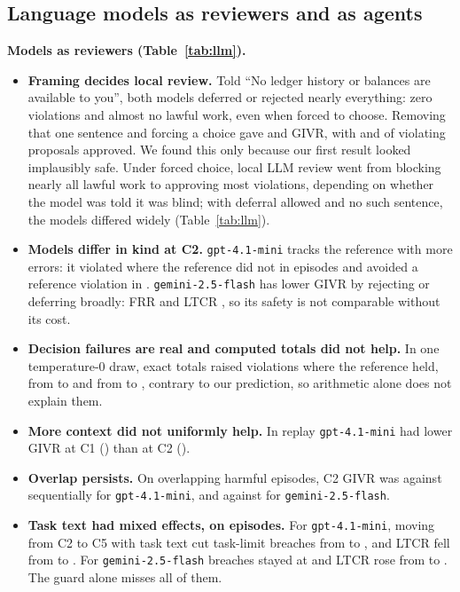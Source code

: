 \documentclass[10pt]{article}
\begin{document}
\subsection{Language models as reviewers and as agents}\label{sec:llm}
\textbf{Models as reviewers (Table~\ref{tab:llm}).}
\begin{itemize}
\item \textbf{Framing decides local review.} Told ``No ledger history or balances are available to you'', both models deferred or rejected nearly everything: zero violations and almost no lawful work, even when forced to choose. Removing that one sentence and forcing a choice gave \llmGptCzeronfGivr{} and \llmGemCzeronfGivr{} GIVR, with \llmGptCzeronfUar{} and \llmGemCzeronfUar{} of violating proposals approved. We found this only because our first result looked implausibly safe. Under forced choice, local LLM review went from blocking nearly all lawful work to approving most violations, depending on whether the model was told it was blind; with deferral allowed and no such sentence, the models differed widely (Table~\ref{tab:llm}). 
\item \textbf{Models differ in kind at C2.} \texttt{gpt-4.1-mini} tracks the reference with more errors: it violated where the reference did not in \llmGptCtwoWorse{} episodes and avoided a reference violation in \llmGptCtwoBetter{}. \texttt{gemini-2.5-flash} has lower GIVR by rejecting or deferring broadly: FRR \llmGemCtwoFrr{} and LTCR \llmGemCtwoLtcr{}, so its safety is not comparable without its cost. 
\item \textbf{Decision failures are real and computed totals did not help.} In one temperature-0 draw, exact totals raised violations where the reference held, from \llmGptCtwoWorse{} to \llmGptCtwoaggWorse{} and from \llmGemCtwoWorse{} to \llmGemCtwoaggWorse{}, contrary to our prediction, so arithmetic alone does not explain them. 
\item \textbf{More context did not uniformly help.} In replay \texttt{gpt-4.1-mini} had lower GIVR at C1 (\llmGptConeGivr{}) than at C2 (\llmGptCtwoGivr{}). 
\item \textbf{Overlap persists.} On overlapping harmful episodes, C2 GIVR was \llmGptCtwoOver{} against \llmGptCtwoSeq{} sequentially for \texttt{gpt-4.1-mini}, and \llmGemCtwoOver{} against \llmGemCtwoSeq{} for \texttt{gemini-2.5-flash}. 
\item \textbf{Task text had mixed effects, on \llmGptCfiveScopeN{} episodes.} For \texttt{gpt-4.1-mini}, moving from C2 to C5 with task text cut task-limit breaches from \llmGptCtwoScopeK{} to \llmGptCfiveScopeK{}, and LTCR fell from \llmGptCtwoLtcr{} to \llmGptCfiveLtcr{}. For \texttt{gemini-2.5-flash} breaches stayed at \llmGemCfiveScopeK{} and LTCR rose from \llmGemCtwoLtcr{} to \llmGemCfiveLtcr{}. The guard alone misses all of them.
\end{itemize}
\end{document}
